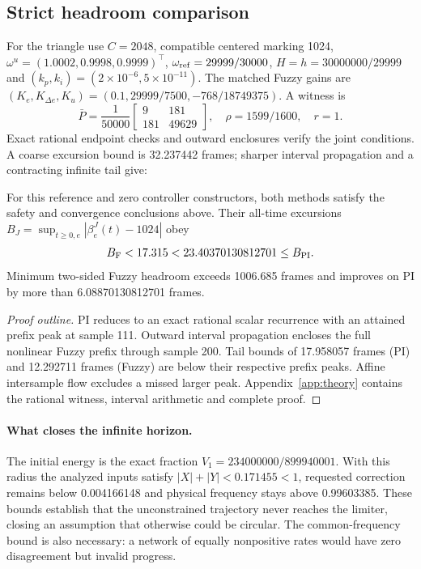 \subsection{Strict headroom comparison}
For the triangle use $C=2048$, compatible centered marking 1024,
$\omega^u=(1.0002,0.9998,0.9999)^\top$,
$\omega_{\rm ref}=29999/30000$, $H=h=30000000/29999$ and
$(k_p,k_i)=(2\times10^{-6},5\times10^{-11})$.
The matched Fuzzy gains are
$(K_e,K_{\Delta e},K_u)=(0.1,29999/7500,-768/18749375)$.
A witness is
\begin{equation}
 \bar P=\frac1{50000}\begin{bmatrix}9&181\\181&49629\end{bmatrix},
 \quad\rho=1599/1600,\quad r=1.
\end{equation}
Exact rational endpoint checks and outward enclosures verify the
joint conditions. A coarse excursion bound is 32.237442 frames;
sharper interval propagation and a contracting infinite tail give:
\begin{btdtheorem}
\label{thm:btd_headroom}
For this reference and zero controller constructors, both methods
satisfy the safety and convergence conclusions above. Their
all-time excursions $B_J=\sup_{t\ge0,e}|\beta_e^J(t)-1024|$ obey
\begin{equation}
 B_{\rm F}<17.315<23.40370130812701\le B_{\rm PI}.
 \label{eq:btd_strict_comparison}
\end{equation}
Minimum two-sided Fuzzy headroom exceeds 1006.685 frames and
improves on PI by more than 6.08870130812701 frames.
\end{btdtheorem}
\begin{proof}[Proof outline]
PI reduces to an exact rational scalar recurrence with an attained
prefix peak at sample 111. Outward interval propagation encloses the
full nonlinear Fuzzy prefix through sample 200. Tail bounds of
17.958057 frames (PI) and 12.292711 frames (Fuzzy) are below their
respective prefix peaks. Affine intersample flow excludes a missed
larger peak. Appendix~\ref{app:theory} contains the rational witness,
interval arithmetic and complete proof.
\end{proof}
\paragraph{What closes the infinite horizon.}
The initial energy is the exact fraction
$V_1=234000000/899940001$. With this radius the analyzed inputs
satisfy $|X|+|Y|<0.171455<1$, requested correction remains below
0.004166148 and physical frequency stays above 0.99603385.
These bounds establish that the unconstrained trajectory never reaches
the limiter, closing an assumption that otherwise could be circular.
The common-frequency bound is also necessary: a network of equally
nonpositive rates would have zero disagreement but invalid progress.

